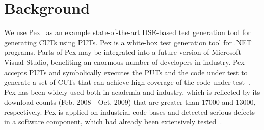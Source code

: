 \section{Background}
\label{sec:background}

We use Pex~\cite{pex:rel} as an example state-of-the-art DSE-based test generation tool for generating CUTs using PUTs. Pex is a white-box test generation tool for .NET programs. Parts of Pex may be integrated into a future version of Microsoft Visual Studio, benefiting an enormous number of developers in industry. Pex accepts PUTs and symbolically executes the PUTs and the code under test to generate a set of CUTs that can achieve high coverage of the code under test~\cite{king:symex}. Pex has been widely used both in academia and industry, which is reflected by its download counts (Feb. 2008 - Oct. 2009) that are greater than $17000$ and $13000$, respectively. Pex is applied on industrial code bases and detected serious defects in a software component, which had already been extensively tested~\cite{tillmann08:pex}. 